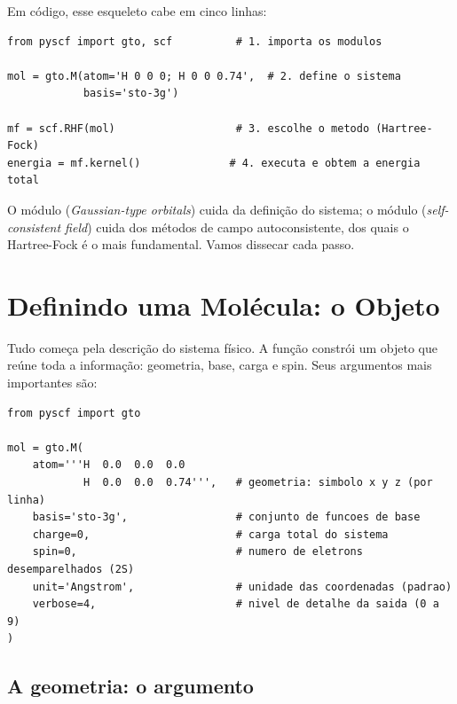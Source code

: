 \noindent
Em código, esse esqueleto cabe em cinco linhas:

\begin{lstlisting}[style=python,caption={O esqueleto de qualquer cálculo PySCF.},label={lst:esqueleto}]
from pyscf import gto, scf          # 1. importa os modulos

mol = gto.M(atom='H 0 0 0; H 0 0 0.74',  # 2. define o sistema
            basis='sto-3g')

mf = scf.RHF(mol)                   # 3. escolhe o metodo (Hartree-Fock)
energia = mf.kernel()              # 4. executa e obtem a energia total
\end{lstlisting}

\noindent
O módulo  (\emph{Gaussian-type orbitals}) cuida da definição do sistema;
o módulo  (\emph{self-consistent field}) cuida dos métodos de campo
autoconsistente, dos quais o Hartree-Fock é o mais fundamental. Vamos dissecar
cada passo.

\section{Definindo uma Molécula: o Objeto }
\label{sec:mole}

Tudo começa pela descrição do sistema físico. A função  constrói um
objeto  que reúne toda a informação: geometria, base, carga e spin. Seus
argumentos mais importantes são:

\begin{lstlisting}[style=python,caption={Os argumentos essenciais de \code{gto.M}.},label={lst:moleargs}]
from pyscf import gto

mol = gto.M(
    atom='''H  0.0  0.0  0.0
            H  0.0  0.0  0.74''',   # geometria: simbolo x y z (por linha)
    basis='sto-3g',                 # conjunto de funcoes de base
    charge=0,                       # carga total do sistema
    spin=0,                         # numero de eletrons desemparelhados (2S)
    unit='Angstrom',                # unidade das coordenadas (padrao)
    verbose=4,                      # nivel de detalhe da saida (0 a 9)
)
\end{lstlisting}

\subsection{A geometria: o argumento }

